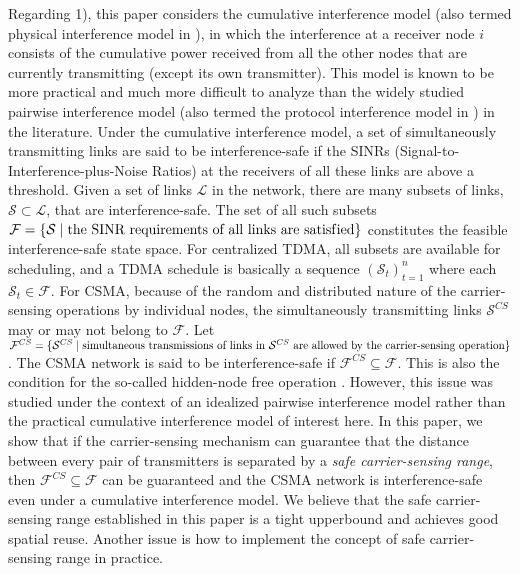 \documentclass[conference]{IEEEtran}
\begin{document}
Regarding 1), this paper considers the cumulative interference model
(also termed physical interference model in \cite{prgupta}), in
which the interference at a receiver node $i$ consists of the
cumulative power received from all the other nodes that are
currently transmitting (except its own transmitter). This model is
known to be more practical and much more diff\/icult to analyze than
the widely studied pairwise interference model (also termed the
protocol interference model in \cite{prgupta}) in the literature.
Under the cumulative interference model, a set of simultaneously
transmitting links are said to be interference-safe if the SINRs
(Signal-to-Interference-plus-Noise Ratios) at the receivers of all
these links are above a threshold. Given a set of links
$\mathcal{L}$ in the network, there are many subsets of links,
$\mathcal{S}\subset \mathcal{L}$, that are interference-safe. The
set of all such subsets $\mathcal{F}=\{\mathcal{S}\mid \text{the
SINR requirements of all links are satisf\/ied}\}$ constitutes the
feasible interference-safe state space. For centralized TDMA, all
subsets are available for scheduling, and a TDMA schedule is
basically a sequence $(\mathcal{S}_t)_{t=1}^n$ where each
$\mathcal{S}_t\in\mathcal{F}$. For CSMA, because of the random and
distributed nature of the carrier-sensing operations by individual
nodes, the simultaneously transmitting links $\mathcal{S}^{CS}$ may
or may not belong to $\mathcal{F}$. Let
$\mathcal{F}^{CS}=\{\mathcal{S}^{CS}\mid \text{simultaneous
}\text{transmissions of links in } \mathcal{S}^{CS} \text{ are
allowed by }\\\text{the carrier-sensing operation}\}$. The CSMA
network is said to be interference-safe if
$\mathcal{F}^{CS}\subseteq \mathcal{F}$. This is also the condition
for the so-called hidden-node free operation \cite{LiBin}. However,
this issue was studied under the context of an idealized pairwise
interference model \cite{LiBin} rather than the practical cumulative
interference model of interest here. In this paper, we show that if
the carrier-sensing mechanism can guarantee that the distance
between every pair of transmitters is separated by a \emph{safe
carrier-sensing range}, then $\mathcal{F}^{CS}\subseteq \mathcal{F}$
can be guaranteed and the CSMA network is interference-safe even
under a cumulative interference model. We believe that the safe
carrier-sensing range established in this paper is a tight
upperbound and achieves good spatial reuse. Another issue is how to
implement the concept of safe carrier-sensing range in practice.
\end{document}
